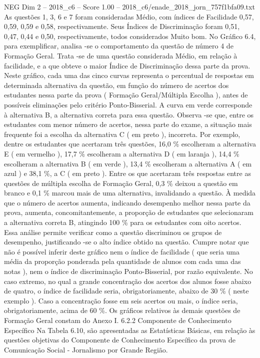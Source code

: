 \begin{textsample}{NEG Dim 2 – 2018\_c6 – Score 1.00 – 2018\_c6/enade\_2018\_jorn\_757f1bfa09.txt}
As questões 1, 3, 6 e 7 foram consideradas Médio, com índices de Facilidade 0,57, 0,59, 0,59 e 0,58, respectivamente.
Seus Índices de Discriminação foram 0,51, 0,47, 0,44 e 0,50, respectivamente, todos considerados Muito bom.
No Gráfico 6.4, para exemplificar, analisa -se o comportamento da questão de número 4 de Formação Geral.
Trata -se de uma questão considerada Médio, em relação à facilidade, e a que obteve o maior Índice de Discriminação dessa parte da prova.
Neste gráfico, cada uma das cinco curvas representa o percentual de respostas em determinada alternativa da questão, em função do número de acertos dos estudantes nessa parte da prova ( Formação Geral/Múltipla Escolha ), antes de possíveis eliminações pelo critério Ponto-Bisserial.
A curva em verde corresponde à alternativa B, a alternativa correta para essa questão.
Observa -se que, entre os estudantes com menor número de acertos, nessa parte do exame, a situação mais frequente foi a escolha da alternativa C ( em preto ), incorreta.
Por exemplo, dentre os estudantes que acertaram três questões, 16,0 \% escolheram a alternativa E ( em vermelho ), 17,7 \% escolheram a alternativa D ( em laranja ), 14,4 \% escolheram a alternativa B ( em verde ), 13,4 \% escolheram a alternativa A ( em azul ) e 38,1 \%, a C ( em preto ).
Entre os que acertaram três respostas entre as questões de múltipla escolha de Formação Geral, 0,3 \% deixou a questão em branco e 0,1 \% marcou mais de uma alternativa, invalidando a questão.
À medida que o número de acertos aumenta, indicando desempenho melhor nessa parte da prova, aumenta, concomitantemente, a proporção de estudantes que selecionaram a alternativa correta B, atingindo 100 \% para os estudantes com oito acertos.
Essa análise permite verificar como a questão discriminou os grupos de desempenho, justificando -se o alto índice obtido na questão.
Cumpre notar que não é possível inferir deste gráfico nem o índice de facilidade ( que seria uma média da proporção ponderada pela quantidade de alunos com cada uma das notas ), nem o índice de discriminação Ponto-Bisserial, por razão equivalente.
No caso extremo, no qual a grande concentração dos acertos dos alunos fosse abaixo de quatro, o índice de facilidade seria, obrigatoriamente, abaixo de 30 \% ( neste exemplo ).
Caso a concentração fosse em seis acertos ou mais, o índice seria, obrigatoriamente, acima de 60 \%.
Os gráficos relativos às demais questões de Formação Geral constam do Anexo I. 6.2.2 Componente de Conhecimento Específico Na Tabela 6.10, são apresentadas as Estatísticas Básicas, em relação às questões objetivas do Componente de Conhecimento Específico da prova de Comunicação Social - Jornalismo por Grande Região.

\end{textsample}
